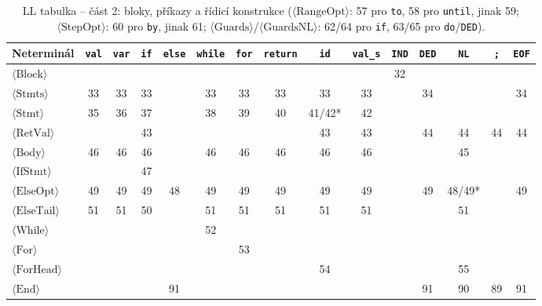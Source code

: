 \documentclass[11pt, a4paper]{article}
\renewcommand{\arraystretch}{1.15}%
\begin{document}
\begin{table}[H]
  \centering
  \footnotesize
  \renewcommand{\arraystretch}{1.22}
  \setlength{\tabcolsep}{2.6pt}
  \begin{tabular}{lcccccccccccccc}
    \toprule
    \textbf{Neterminál} & \texttt{val} & \texttt{var} & \texttt{if} & \texttt{else} & \texttt{while} & \texttt{for} & \texttt{return} & \texttt{id} & \texttt{val\_s} & \texttt{IND} & \texttt{DED} & \texttt{NL} & \texttt{;} & \texttt{EOF} \\
    \midrule
    $\langle\text{Block}\rangle$    & & & & & & & & & & 32 & & & & \\
    $\langle\text{Stmts}\rangle$    & 33 & 33 & 33 & & 33 & 33 & 33 & 33 & 33 & & 34 & & & 34 \\
    $\langle\text{Stmt}\rangle$     & 35 & 36 & 37 & & 38 & 39 & 40 & 41/42* & 42 & & & & & \\
    $\langle\text{RetVal}\rangle$   & & & 43 & & & & & 43 & 43 & & 44 & 44 & 44 & 44 \\
    $\langle\text{Body}\rangle$     & 46 & 46 & 46 & & 46 & 46 & 46 & 46 & 46 & & & 45 & & \\
    $\langle\text{IfStmt}\rangle$   & & & 47 & & & & & & & & & & & \\
    $\langle\text{ElseOpt}\rangle$  & 49 & 49 & 49 & 48 & 49 & 49 & 49 & 49 & 49 & & 49 & 48/49* & & 49 \\
    $\langle\text{ElseTail}\rangle$ & 51 & 51 & 50 & & 51 & 51 & 51 & 51 & 51 & & & 51 & & \\
    $\langle\text{While}\rangle$    & & & & & 52 & & & & & & & & & \\
    $\langle\text{For}\rangle$      & & & & & & 53 & & & & & & & & \\
    $\langle\text{ForHead}\rangle$  & & & & & & & & 54 & & & & 55 & & \\
    $\langle\text{End}\rangle$      & & & & 91 & & & & & & & 91 & 90 & 89 & 91 \\
    \bottomrule
  \end{tabular}
  \caption{LL tabulka -- část 2: bloky, příkazy a řídicí konstrukce ($\langle\text{RangeOpt}\rangle$: 57 pro \texttt{to}, 58 pro \texttt{until}, jinak 59; $\langle\text{StepOpt}\rangle$: 60 pro \texttt{by}, jinak 61; $\langle\text{Guards}\rangle$/$\langle\text{GuardsNL}\rangle$: 62/64 pro \texttt{if}, 63/65 pro \texttt{do}/\texttt{DED}).}
  \label{tab:ll2}
\end{table}
\end{document}
